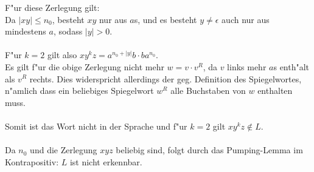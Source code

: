 \documentclass[a4paper,12pt]{article}
\begin{document}
    F"ur diese Zerlegung gilt: \\
    Da $ |xy| \leq n_0 $, besteht $ xy $ nur aus $ a $s, und es besteht $ y \neq \epsilon $ auch nur aus mindestens $ a $,
    sodass $ |y| > 0$. \\ \\
    F"ur $ k = 2 $ gilt also $ xy^k z = a^{n_0 + |y|} b \cdot b a^{n_0} $. \\
    Es gilt f"ur die obige Zerlegung nicht mehr $ w = v \cdot v^R $, da $ v $ links mehr $ a $s enth"alt als $ v^R $ rechts.
    Dies widerspricht allerdings der geg. Definition des Spiegelwortes,
    n"amlich dass ein beliebiges Spiegelwort $ w^R $ alle Buchstaben von $ w $ enthalten muss. \\ \\
    Somit ist das Wort nicht in der Sprache und f"ur $ k = 2 $ gilt $ xy^k z \notin L $. \\ \\
    Da $ n_0 $ und die Zerlegung $ xyz $ beliebig sind, folgt durch das Pumping-Lemma im Kontrapositiv: $ L $ ist nicht erkennbar.
\end{document}
